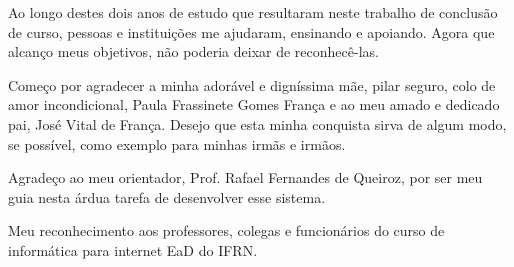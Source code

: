 \begin{agradecimentos}








Ao longo destes dois anos de estudo que resultaram neste trabalho de conclusão de curso, pessoas e
instituições me ajudaram, ensinando e apoiando. Agora que alcanço meus
objetivos, não poderia deixar de reconhecê-las.

Começo por agradecer a minha adorável e digníssima mãe, pilar seguro, colo de amor incondicional, Paula Frassinete Gomes França e ao meu amado e dedicado pai, José Vital de França. Desejo que esta minha conquista sirva de algum modo, se possível, como exemplo para minhas irmãs e irmãos.

Agradeço ao meu orientador, Prof. Rafael Fernandes de Queiroz, por ser meu guia nesta árdua tarefa de desenvolver esse sistema.

 

Meu reconhecimento aos professores, colegas e funcionários do curso de informática para internet EaD do IFRN.



\end{agradecimentos}
